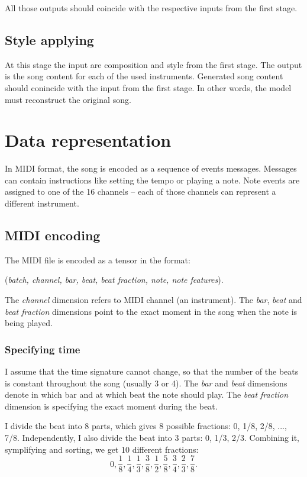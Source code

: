 \documentclass[en]{pracamgr}
\begin{document}
All those outputs should coincide with the respective inputs from the first stage.

\section{Style applying}

At this stage the input are composition and style from the first stage.
The output is the song content for each of the used instruments.
Generated song content should conincide with the input from the first stage.
In other words, the model must reconstruct the original song.

\chapter{Data representation}

In MIDI format, the song is encoded as a sequence of events messages.
Messages can contain instructions like setting the tempo or playing a note.
Note events are assigned to one of the 16 channels -- each of those channels can represent a different instrument.

\section{MIDI encoding}

The MIDI file is encoded as a tensor in the format:
\begin{center}
    (\emph{batch, channel, bar, beat, beat fraction, note, note features}).
\end{center}

The \emph{channel} dimension refers to MIDI channel (an instrument).
The \emph{bar}, \emph{beat} and \emph{beat fraction} dimensions point to the exact moment in the song when the note is being played.

\subsection{Specifying time}

I assume that the time signature cannot change, so that the number of the beats is constant throughout the song (usually 3 or 4).
The \emph{bar} and \emph{beat} dimensions denote in which bar and at which beat the note should play.
The \emph{beat fraction} dimension is specifying the exact moment during the beat.

I divide the beat into 8 parts, which gives 8 possible fractions: 0, 1/8, 2/8, ..., 7/8.
Independently, I also divide the beat into 3 parts: 0, 1/3, 2/3.
Combining it, symplifying and sorting, we get 10 different fractions:
$$
0, \frac{1}{8}, \frac{1}{4}, \frac{1}{3}, \frac{3}{8}, \frac{1}{2}, \frac{5}{8}, \frac{3}{4}, \frac{2}{3}, \frac{7}{8}.
$$
\end{document}
